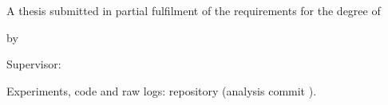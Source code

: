 \begin{titlepage}
\centering
\vspace*{0.4cm}
{\large\scshape \thesisuniv\par}
\vspace{2pt}
{\normalsize \thesisdept\par}
\vspace{1.4cm}
{\fontsize{26}{30}\selectfont\bfseries \thesistitle\par}
\vspace{0.7cm}
{\Large \thesissubtitle\par}
\vspace{1.3cm}
{\large A thesis submitted in partial fulfilment of the requirements for the degree of\par}
\vspace{4pt}
{\large\itshape \thesisdegree\par}
\vspace{1.0cm}
{\large by\par}
\vspace{4pt}
{\Large\bfseries \thesisauthor\par}
\vspace{0.9cm}
{\large Supervisor: \thesissupervisor\par}
\vfill
{\large \thesisdate\par}
\vspace{0.6cm}
{\footnotesize Experiments, code and raw logs: repository  (analysis commit \code{\repocommit}).\par}
\end{titlepage}
\cleardoublepage
